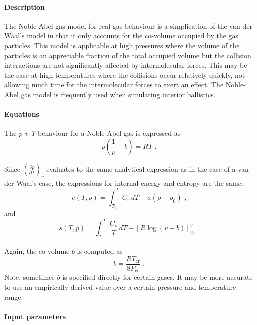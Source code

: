 \paragraph{Description}
The Noble-Abel gas model for real gas behaviour is a simplication of
the van der Waal's model in that it only accounts for the co-volume
occupied by the gas particles.
This model is applicable at high pressures where the volume of
the particles is an appreciable fraction of the total occupied volume
but the collision interactions are not significantly affected
by intermolecular forces.
This may be the case at high temperatures where the collisions
occur relatively quickly, not allowing much time for the intermolecular
forces to exert an effect.
The Noble-Abel gas model is frequently used when simulating interior
ballistics.

\paragraph{Equations}
The \textit{p-v-T} behaviour for a Noble-Abel gas is expressed as
\begin{equation}
  p \left( \frac{1}{\rho} - b \right ) = RT \text{ . }
\end{equation}

Since $\left( \frac{\partial p}{\partial T} \right)_v$ evaluates to the same analytical expression as in the case of a van der Waal's case, the expressions for internal
energy and entropy are the same:
\begin{equation}
e(T, \rho) = \int_{T_0}^{T} C_v\,dT + a \left( \rho - \rho_0 \right) \text{ , }
\end{equation}
and 
\begin{equation}
s(T,p) = \int_{T_0}^{T} \frac{C_v}{T}\,dT + \left [ R \log \left( v - b \right ) \right ]_{v_0}^{v} \text { . }
\end{equation}

Again, the co-volume $b$ is computed as
\begin{equation}
   b = \frac{R T_{\text{cr}}}{8 P_{\text{cr}}} \text{ . }
\end{equation}
Note, sometimes $b$ is specified directly for certain gases.
It may be more accurate to use an empirically-derived value
over a certain pressure and temperature range.

\paragraph{Input parameters}

